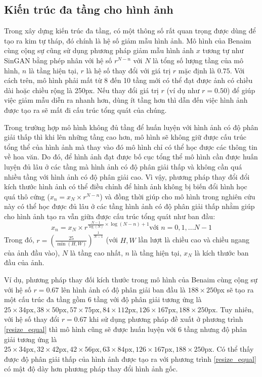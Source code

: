 \documentclass[12pt]{report}%
\begin{document}
\subsection{Kiến trúc đa tầng cho hình ảnh} 
\label{resize}
Trong xây dựng kiến trúc đa tầng, có một thông số rất quan trọng được dùng để tạo ra kim tự tháp, đó chính là hệ số giảm mẫu hình ảnh. Mô hình của  Benaim cùng  cộng sự cũng sử dụng phương pháp giảm mẫu hình ảnh $x$ tương tự như SinGAN  bằng phép nhân với hệ số  $r^{N-n}$ với $N$ là tổng số lượng tầng của mô hình, $n$ là tầng hiện tại, $r$ là hệ số thay đổi với  giá trị $r$ mặc định là $0.75$. Với cách trên, mô hình phải mất từ 8 đến 10 tầng mới có thể đạt được ảnh có chiều dài hoặc chiều rộng là 250px. Nếu thay đổi giá trị $r$ (ví dụ như $r=0.50$) để giúp việc giảm mẫu diễn ra nhanh hơn, dùng ít tầng hơn thì dẫn đến việc hình ảnh được tạo ra sẽ mất đi cấu trúc tổng quát của chúng.

Trong trường hợp mô hình không đủ tầng để huấn luyện với hình ảnh có độ phân giải thấp thì khi lên những tầng cao hơn, mô hình sẽ không giữ được cấu trúc tổng thể của hình ảnh mà thay vào đó mô hình chỉ có thể học được các thông tin về hoa văn. Do đó, để hình ảnh đạt được bố cục tổng thể  mô hình cần được huấn luyện  đủ lâu ở các tầng mà  hình ảnh có độ phân giải thấp và  không cần quá nhiều tầng với hình ảnh có độ phân giải cao. Vì vậy, phương pháp thay đổi đổi kích thước hình ảnh có thể điều chỉnh để hình ảnh không bị biến đổi hình học quá thô cứng ($x_n = x_N \times r^{N-n}$) và đồng thời giúp cho mô hình trong nghiên cứu này có thể học được đủ lâu ở các tầng hình ảnh  có độ phân giải thấp nhằm giúp cho hình ảnh tạo ra vẫn giữa được cấu trúc tổng quát như ban đầu:
\begin{equation}\label{resize_equal}
    {x_n} = {x_N} \times {r^{\frac{{N - 1}}{{\log \left( N \right)}} \times \log \left( {N - n} \right) + 1}} \textrm{với }  n = 0,1,...N - 1
    \end{equation}
Trong đó,  $r = {\left( {\frac{{25}}{{\min (H,W)}}} \right)^{\frac{1}{{N - 1}}}}$ (với $H,W$ lần lượt là chiều cao và chiều ngang của ảnh đầu vào), $N$ là tầng cao nhất, $n$ là tầng hiện tại, $x_N$ là kích thước ban đầu của  ảnh.

Ví dụ, phương pháp thay đối kích thước trong mô hình của  Benaim cùng cộng sự với hệ số $r = 0.67$  lên hình ảnh có độ phân giải ban đầu là $188 \times 250$px  sẽ tạo ra một cấu trúc đa tầng gồm 6 tầng với độ phân giải tương ứng là  $25\times34\text{px},38\times 50\text{px}, 57 \times 75\text{px}, 84 \times112\text{px}, 126 \times 167\text{px}, 188 \times 250\text{px}$. Tuy nhiên, với hệ số thay đổi 
 $r=0.67$ khi sử dụng phương pháp đề xuất ở phương trình \ref{resize_equal} thì mô hình cũng sẽ được huấn luyện với 6 tầng nhưng  độ phân giải tương ứng là $25 \times 34\text{px}, 32 \times 42\text{px}, 42 \times 56\text{px}, 63 \times 84\text{px}, 126 \times 167\text{px}, 188 \times 250\text{px}$. Có thể thấy được độ phân giải thấp của hình ảnh được tạo ra với phương trình \ref{resize_equal} có mật độ dày hơn phương pháp thay đổi hình ảnh gốc.
\end{document}
